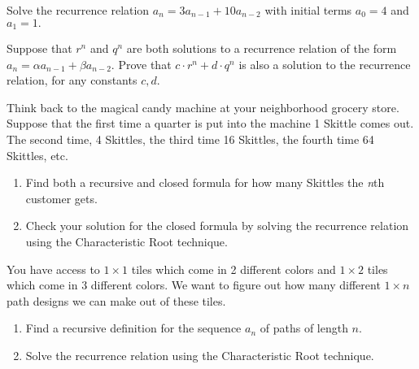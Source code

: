 \documentclass[11pt,]{book}
\theoremstyle{ptxplainnotitle}
\theoremstyle{ptxplaintitle}
\theoremstyle{ptxdefinitionnotitle}
\theoremstyle{ptxdefinitiontitle}
\theoremstyle{ptxdefinitionnotitle}
\theoremstyle{ptxdefinitiontitle}
\theoremstyle{ptxdefinitionnotitle}
\theoremstyle{ptxdefinitiontitle}
\theoremstyle{ptxdefinitiontitlenonumber}
\theoremstyle{ptxdefinitiontitlenonumber}
\numberwithin{equation}{chapter}
\begin{document}
\begin{divisionexercise}{7}\hypertarget{exercise-48}{}
\hypertarget{p-500}{}%
Solve the recurrence relation \(a_n = 3a_{n-1} + 10a_{n-2}\) with initial terms \(a_0 = 4\) and \(a_1 = 1\text{.}\)%
\end{divisionexercise}%
\begin{divisionexercise}{8}\hypertarget{exercise-49}{}
\hypertarget{p-503}{}%
Suppose that \(r^n\) and \(q^n\) are both solutions to a recurrence relation of the form \(a_n = \alpha a_{n-1} + \beta a_{n-2}\).  Prove that \(c\cdot r^n + d \cdot q^n\) is also a solution to the recurrence relation, for any constants \(c, d\).%
\end{divisionexercise}%
\begin{divisionexercise}{9}\hypertarget{exercise-50}{}
\hypertarget{p-504}{}%
Think back to the magical candy machine at your neighborhood grocery store. Suppose that the first time a quarter is put into the machine 1 Skittle comes out. The second time, 4 Skittles, the third time 16 Skittles, the fourth time 64 Skittles, etc. \leavevmode%
\begin{enumerate}[label=(\alph*)]
\item\hypertarget{li-230}{}\hypertarget{p-505}{}%
Find both a recursive and closed formula for how many Skittles the \emph{n}th customer gets.%
\item\hypertarget{li-231}{}\hypertarget{p-506}{}%
Check your solution for the closed formula by solving the recurrence relation using the Characteristic Root technique.%
\end{enumerate}
%
\end{divisionexercise}%
\begin{divisionexercise}{10}\hypertarget{exercise-51}{}
\hypertarget{p-507}{}%
You have access to \(1 \times 1\) tiles which come in 2 different colors and \(1\times 2\) tiles which come in 3 different colors. We want to figure out how many different \(1 \times n\) path designs we can make out of these tiles.%
\leavevmode%
\begin{enumerate}[label=(\alph*)]
\item\hypertarget{li-232}{}\hypertarget{p-508}{}%
Find a recursive definition for the sequence \(a_n\) of paths of length \(n\).%
\item\hypertarget{li-233}{}\hypertarget{p-509}{}%
Solve the recurrence relation using the Characteristic Root technique.%
\end{enumerate}
\end{divisionexercise}%
\end{document}
